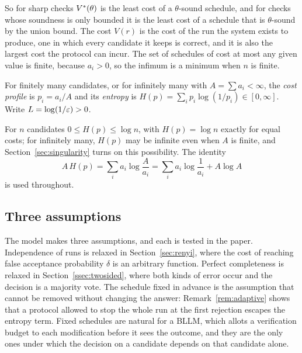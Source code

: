 So for sharp checks $V^{*}(\theta)$ is the least cost of a $\theta$-sound schedule, and for checks whose soundness is only bounded it is the least cost of a schedule that is $\theta$-sound by the union bound. The cost $V(r)$ is the cost of the run the system exists to produce, one in which every candidate it keeps is correct, and it is also the largest cost the protocol can incur. The set of schedules of cost at most any given value is finite, because $a_{i}>0$, so the infimum is a minimum when $n$ is finite.

\begin{definition}[Profile]\label{def:profile}
For finitely many candidates, or for infinitely many with $A=\sum a_{i}<\infty$, the \emph{cost profile} is $p_{i}=a_{i}/A$ and its \emph{entropy} is $H(p)=\sum_{i}p_{i}\log(1/p_{i})\in[0,\infty]$. Write $L=\log(1/\varepsilon)>0$.
\end{definition}

For $n$ candidates $0\le H(p)\le\log n$, with $H(p)=\log n$ exactly for equal costs; for infinitely many, $H(p)$ may be infinite even when $A$ is finite, and Section~\ref{sec:singularity} turns on this possibility. The identity
\begin{equation}\label{eq:AH}
A\,H(p)=\sum_{i}a_{i}\log\frac{A}{a_{i}}=\sum_{i}a_{i}\log\frac1{a_{i}}+A\log A
\end{equation}
is used throughout.

\subsection{Three assumptions}

The model makes three assumptions, and each is tested in the paper. Independence of runs is relaxed in Section~\ref{sec:renyi}, where the cost of reaching false acceptance probability $\delta$ is an arbitrary function. Perfect completeness is relaxed in Section~\ref{ssec:twosided}, where both kinds of error occur and the decision is a majority vote. The schedule fixed in advance is the assumption that cannot be removed without changing the answer: Remark~\ref{rem:adaptive} shows that a protocol allowed to stop the whole run at the first rejection escapes the entropy term. Fixed schedules are natural for a BLLM, which allots a verification budget to each modification before it sees the outcome, and they are the only ones under which the decision on a candidate depends on that candidate alone.
